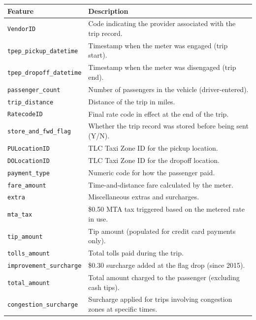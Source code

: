 \documentclass[11pt]{article}
\begin{document}
    \begin{longtable}[]{@{}
  >{\raggedright\arraybackslash}p{}
  >{\raggedright\arraybackslash}p{}@{}}
\toprule\noalign{}
\begin{minipage}[b]{\linewidth}\raggedright
\textbf{Feature}
\end{minipage} & \begin{minipage}[b]{\linewidth}\raggedright
\textbf{Description}
\end{minipage} \\
\midrule\noalign{}
\endhead
\bottomrule\noalign{}
\endlastfoot
\texttt{VendorID} & Code indicating the provider associated with the
trip record. \\
\texttt{tpep\_pickup\_datetime} & Timestamp when the meter was engaged
(trip start). \\
\texttt{tpep\_dropoff\_datetime} & Timestamp when the meter was
disengaged (trip end). \\
\texttt{passenger\_count} & Number of passengers in the vehicle
(driver-entered). \\
\texttt{trip\_distance} & Distance of the trip in miles. \\
\texttt{RatecodeID} & Final rate code in effect at the end of the
trip. \\
\texttt{store\_and\_fwd\_flag} & Whether the trip record was stored
before being sent (Y/N). \\
\texttt{PULocationID} & TLC Taxi Zone ID for the pickup location. \\
\texttt{DOLocationID} & TLC Taxi Zone ID for the dropoff location. \\
\texttt{payment\_type} & Numeric code for how the passenger paid. \\
\texttt{fare\_amount} & Time-and-distance fare calculated by the
meter. \\
\texttt{extra} & Miscellaneous extras and surcharges. \\
\texttt{mta\_tax} & \$0.50 MTA tax triggered based on the metered rate
in use. \\
\texttt{tip\_amount} & Tip amount (populated for credit card payments
only). \\
\texttt{tolls\_amount} & Total tolls paid during the trip. \\
\texttt{improvement\_surcharge} & \$0.30 surcharge added at the flag
drop (since 2015). \\
\texttt{total\_amount} & Total amount charged to the passenger
(excluding cash tips). \\
\texttt{congestion\_surcharge} & Surcharge applied for trips involving
congestion zones at specific times. \\
\end{longtable}
\end{document}
